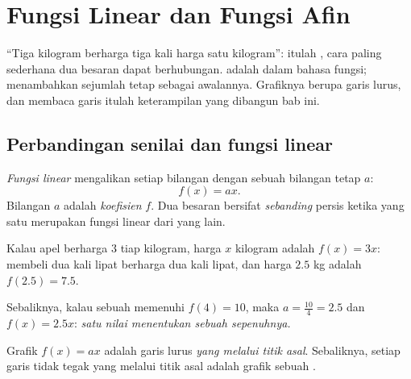 \chapter{Fungsi Linear dan Fungsi Afin}\label{ch:g9:linfunc}

``Tiga kilogram berharga tiga kali harga satu kilogram'': itulah
, cara paling sederhana dua besaran dapat
berhubungan.  adalah  dalam bahasa
fungsi;  menambahkan sejumlah tetap sebagai awalannya.
Grafiknya berupa garis lurus, dan membaca garis itulah keterampilan
yang dibangun bab ini.

\section{Perbandingan senilai dan fungsi linear}

\begin{definition}\label{def:g9:linfunc:linear}
\emph{Fungsi linear} mengalikan setiap bilangan
dengan sebuah bilangan tetap $a$:
\[
f(x) = a x .
\]
Bilangan $a$ adalah \emph{koefisien} $f$. Dua besaran bersifat
\emph{sebanding} persis ketika yang satu
merupakan fungsi linear dari yang lain.
\end{definition}

\begin{example}\label{ex:g9:linfunc:linear}
Kalau apel berharga $3$ tiap kilogram, harga $x$ kilogram adalah
$f(x) = 3x$: membeli dua kali lipat berharga dua kali lipat, dan harga
$2.5$ kg adalah $f(2.5) = 7.5$.

Sebaliknya, kalau sebuah  memenuhi $f(4) = 10$, maka
$a = \frac{10}{4} = 2.5$ dan $f(x) = 2.5x$: \emph{satu nilai
menentukan sebuah  sepenuhnya.}
\end{example}

\begin{proposition}\label{prop:g9:linfunc:lineargraph}
Grafik $f(x) = ax$ adalah garis lurus \emph{yang melalui titik asal}.
Sebaliknya, setiap garis tidak tegak yang melalui titik asal adalah
grafik sebuah .
\end{proposition}
\admitted

